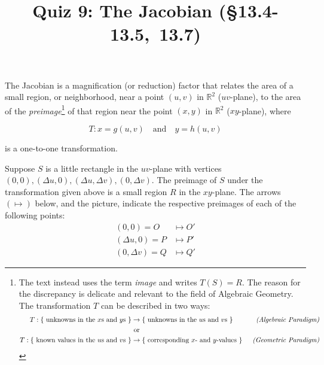 \documentclass[12pt]{article}
\title{\flushleft\vspace{-2.5pc}\Large
	\bf Quiz 9: The Jacobian (\S13.4-13.5,\ 13.7)}
\author{}
\date{}
\begin{document}
\maketitle

\vspace{-4pc}
%
The Jacobian is a magnification (or reduction) factor that relates the area of a small region, or neighborhood, near a point $(u,v)$ in $\mathbb R^2$ ($uv$-plane), to the area of the \textit{preimage}\footnote{
	The text instead uses the term \textit{image} and writes $T(S)=R$.  The reason for the discrepancy is delicate and relevant to the field of Algebraic Geometry.  The transformation $T$ can be described in two ways:
	\begin{align*}
	T:\left\{\text{ unknowns in the $x$s and $y$s }\right\} &\to \left\{\text{ unknowns in the $u$s and $v$s }\right\} &\quad \text{\it (Algebraic Paradigm)} \\
		&\text{ or } & \\
	T:\left\{\text{ known values in the $u$s and $v$s }\right\}	&\to \left\{\text{ corresponding $x$- and $y$-values }\right\} & \text{\it (Geometric Paradigm)}
	\end{align*} 
} of that region near the point $(x,y)$ in $\mathbb R^2$ ($xy$-plane), where 

\vspace{-1pc}
\[
T:x=g(u,v)\quad \text{and}\quad y=h(u,v)
\]

\vspace{-0.5pc}
\noindent is a one-to-one transformation.   
\vspace{1pc} 

Suppose $S$ is a little rectangle in the $uv$-plane with vertices $(0,0),(\Delta u,0),(\Delta u,\Delta v),(0,\Delta v)$.  The preimage of $S$ under the transformation given above is a small region $R$ in the $xy$-plane.  The arrows $(\mapsto)$ below, and the picture, indicate the respective preimages of each of the following points:
\vspace{-0.75pc}
\[\begin{split}
(0,0)=O & \mapsto O'%
\\
(\Delta u,0)=P & \mapsto P'%
\\
(0,\Delta v)=Q & \mapsto Q'%
\end{split}\]
\end{document}

